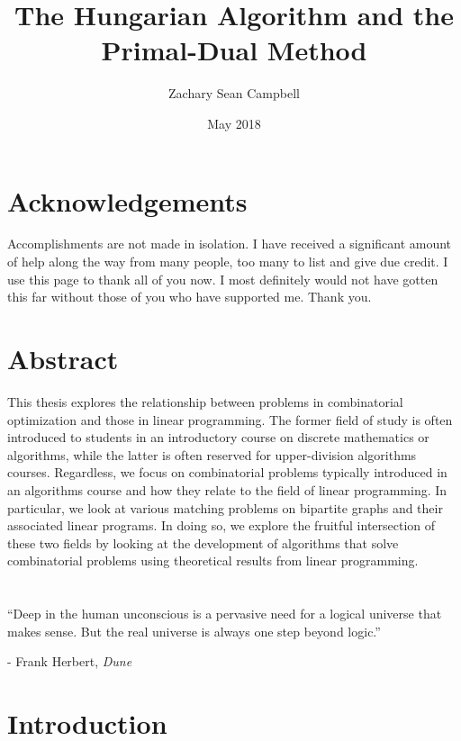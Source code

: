 \documentclass[11pt,twoside]{reedthesis}
\title{The Hungarian Algorithm and the Primal-Dual Method}
\author{Zachary Sean Campbell}
\date{May 2018}
\renewcommand{\'}{^{'}}
\theoremstyle{plain}
\theoremstyle{definition}
\begin{document}
    \maketitle
    \frontmatter %
    \pagestyle{empty} %

\chapter*{Acknowledgements}
Accomplishments are not made in isolation. I have received a significant amount of help along the way 
from many people, too many to list and give due credit. I use this page to thank all of you now. 
I most definitely would not have gotten this far without those of you who have supported me. Thank you.

\tableofcontents
\chapter*{Abstract}
This thesis explores the relationship between problems in combinatorial optimization 
and those in linear programming. The former field of study is often introduced to students in an 
introductory course on discrete mathematics or algorithms, while the latter is often reserved for 
upper-division algorithms courses. 
Regardless, we focus on combinatorial problems typically introduced in an algorithms course and how 
they relate to the field of linear programming. In particular, we look at various matching problems 
on bipartite graphs and their associated linear programs. In doing so, we explore the fruitful 
intersection of these two fields by looking at the development of algorithms that solve combinatorial 
problems using theoretical results from linear programming.

\chapter*{}
``Deep in the human unconscious is a pervasive need for a logical universe that makes sense. But the 
real universe is always one step beyond logic.''

- Frank Herbert, \emph{Dune}
\mainmatter %
\pagestyle{fancyplain} %

\chapter*{Introduction}
\end{document}
